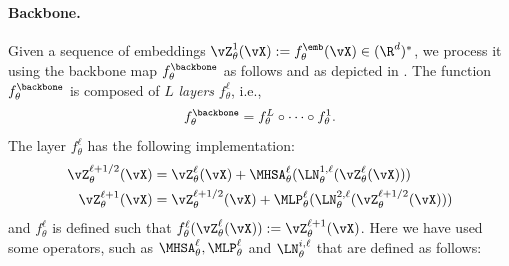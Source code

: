 \documentclass[../../book-main.tex]{subfiles}
\begin{document}
\paragraph{Backbone.} Given a sequence of embeddings \(\vZ_{\theta}^{1}(\vX) := f_{\theta}^{\emb}(\vX) \in (\R^{d})^{*}\), we process it using the backbone map \(f_{\theta}^{\backbone}\) as follows and as depicted in . The function \(f_{\theta}^{\backbone}\) is composed of \(L\) \textit{layers} \(f_{\theta}^{\ell}\), i.e.,
\begin{equation}
    f_{\theta}^{\backbone} = f_{\theta}^{L} \circ \cdots \circ f_{\theta}^{1}.
\end{equation}
 The layer \(f_{\theta}^{\ell}\) has the following implementation:
\begin{align}\label{eq:vit-res-block}
    \vZ_{\theta}^{\ell + 1/2}(\vX)
    &= \vZ_{\theta}^{\ell}(\vX) + \MHSA_{\theta}^{\ell}(\LN_{\theta}^{1, \ell}(\vZ_{\theta}^{\ell}(\vX))) \\ 
    \vZ_{\theta}^{\ell + 1}(\vX)
    &= \vZ_{\theta}^{\ell + 1/2}(\vX) + \MLP_{\theta}^{\ell}(\LN_{\theta}^{2, \ell}(\vZ_{\theta}^{\ell + 1/2}(\vX)))
\end{align}
and \(f_{\theta}^{\ell}\) is defined such that \(f_{\theta}^{\ell}(\vZ_{\theta}^{\ell}(\vX)) := \vZ_{\theta}^{\ell + 1}(\vX)\). Here we have used some operators, such as \(\MHSA_{\theta}^{\ell}, \MLP_{\theta}^{\ell}\) and \(\LN_{\theta}^{i, \ell}\) that are defined as follows:
\end{document}

